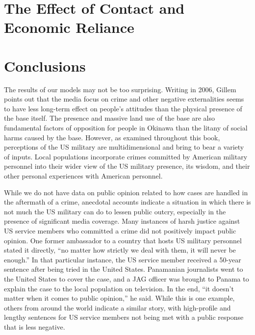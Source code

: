\section*{The Effect of Contact and Economic Reliance}


\section*{Conclusions}

The results of our models may not be too surprising. Writing in 2006, Gillem points out that the media focus on crime and other negative externalities seems to have less long-term effect on people's attitudes than the physical presence of the base itself.\cite{Gillem2007} The presence and massive land use of the base are also fundamental factors of opposition for people in Okinawa than the litany of social harms caused by the base. However, as examined throughout this book, perceptions of the US military are multidimensional and bring to bear a variety of inputs. Local populations incorporate crimes committed by American military personnel into their wider view of the US military presence, its wisdom, and their other personal experiences with American personnel. 

While we do not have data on public opinion related to how cases are handled in the aftermath of a crime, anecdotal accounts indicate a situation in which there is not much the US military can do to lessen public outcry, especially in the presence of significant media coverage. Many instances of harsh justice against US service members who committed a crime did not positively impact public opinion. One former ambassador to a country that hosts US military personnel stated it directly, ``no matter how strictly we deal with them, it will never be enough.'' \cite{amb20180713} In that particular instance, the US service member received a 50-year sentence after being tried in the United States. Panamanian journalists went to the United States to cover the case, and a JAG officer was brought to Panama to explain the case to the local population on television. In the end, ``it doesn't matter when it comes to public opinion,'' he said. While this is one example, others from around the world indicate a similar story, with high-profile and lengthy sentences for US service members not being met with a public response that is less negative.


